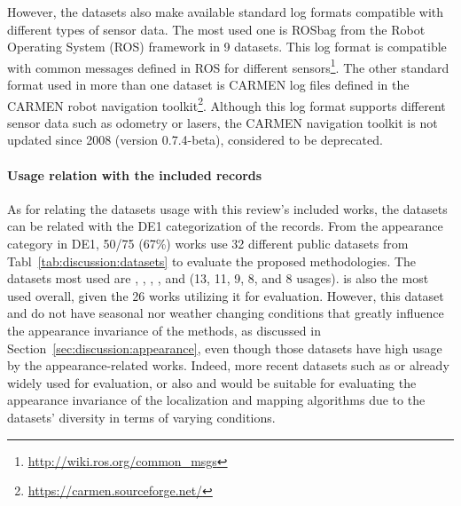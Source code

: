 However, the datasets also make available standard log formats compatible with different types of sensor data.
The most used one is ROSbag from the Robot Operating System (ROS) framework in 9 datasets. This log format is compatible with common messages defined in ROS for different sensors\footnote{\url{http://wiki.ros.org/common_msgs}}.
The other standard format used in more than one dataset is CARMEN log files defined in the CARMEN robot navigation toolkit\footnote{\url{https://carmen.sourceforge.net/}}. Although this log format supports different sensor data such as odometry or lasers, the CARMEN navigation toolkit is not updated since 2008 (version 0.7.4-beta), considered to be deprecated.


\paragraph{Usage relation with the included records}

As for relating the datasets usage with this review's included works, the datasets can be related with the DE1 categorization of the records. From the appearance category in DE1, 50/75 (67\%) works use 32 different public datasets from Tabl~\ref{tab:discussion:datasets} to evaluate the proposed methodologies. The datasets most used are , , , , and  (13, 11, 9, 8, and 8 usages).  is also the most used overall, given the 26 works utilizing it for evaluation. However, this dataset and  do not have seasonal nor weather changing conditions that greatly influence the appearance invariance of the methods, as discussed in Section~\ref{sec:discussion:appearance}, even though those datasets have high usage by the appearance-related works. Indeed, more recent datasets such as  or  already widely used for evaluation, or also  and  would be suitable for evaluating the appearance invariance of the localization and mapping algorithms due to the datasets' diversity in terms of varying conditions.

